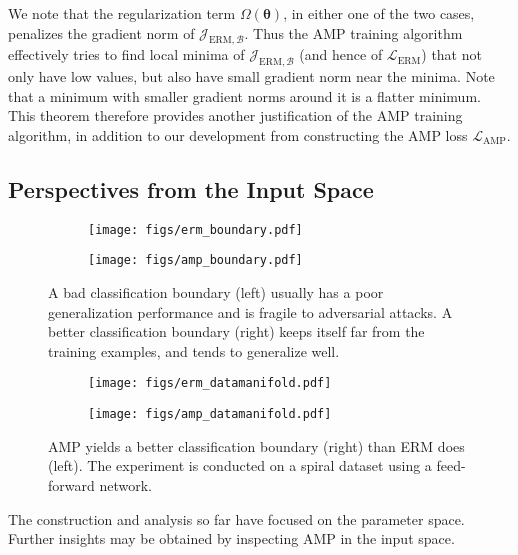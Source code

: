 \documentclass[final]{cvpr}
\begin{document}
We note that the regularization term $\Omega(\boldsymbol{\theta})$, in either one of the two cases, penalizes the gradient norm of $\mathcal{J}_{\mathrm{ERM},\mathcal{B}}$. Thus the AMP training algorithm effectively tries to find local minima of $\mathcal{J}_{\mathrm{ERM},\mathcal{B}}$ (and hence of $\mathcal{L}_\mathrm{ERM}$) that not only have low values, but also have small gradient norm near the minima. Note that a minimum with smaller gradient norms around it is a flatter minimum. This theorem therefore provides another justification of the AMP training algorithm, in addition to our development from constructing the AMP loss $\mathcal{L}_\mathrm{AMP}$.

\subsection{Perspectives from the Input Space}

\begin{figure}[t]
\centering
\begin{subfigure}{0.45\columnwidth}\centering \texttt{[image: figs/erm\_boundary.pdf]}\end{subfigure}\begin{subfigure}{0.45\columnwidth}\centering \texttt{[image: figs/amp\_boundary.pdf]}\end{subfigure}\caption{A bad classification boundary (left) usually has a poor generalization performance and is fragile to adversarial attacks. A better classification boundary (right) keeps itself far from the training examples, and tends to generalize well.}
\label{fig:boundary}
\end{figure}

\begin{figure}[t]
\centering
\begin{subfigure}{0.45\columnwidth}\centering \texttt{[image: figs/erm\_datamanifold.pdf]}\end{subfigure}\begin{subfigure}{0.45\columnwidth}\centering \texttt{[image: figs/amp\_datamanifold.pdf]}\end{subfigure}\caption{AMP yields a better classification boundary (right) than ERM does (left). The experiment is conducted on a spiral dataset \cite{sugiyama2015introduction} using a feed-forward network.}
\label{fig:datamanifold}
\end{figure}

The construction and analysis so far have focused on the parameter space. Further insights may be obtained by inspecting AMP in the input space. 
\end{document}
